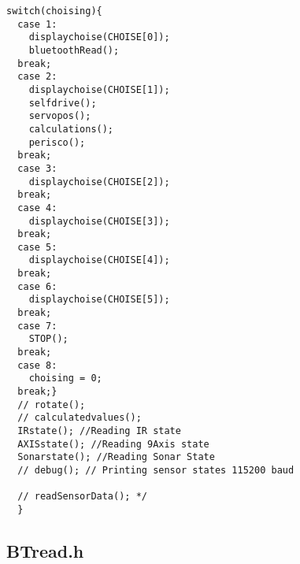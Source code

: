 \begin{lstlisting}
switch(choising){
  case 1:
    displaychoise(CHOISE[0]);
    bluetoothRead();
  break;
  case 2:
    displaychoise(CHOISE[1]);
    selfdrive();
    servopos();
    calculations();
    perisco();
  break;
  case 3:
    displaychoise(CHOISE[2]);
  break;
  case 4:
    displaychoise(CHOISE[3]);
  break;
  case 5:
    displaychoise(CHOISE[4]);
  break;
  case 6:
    displaychoise(CHOISE[5]);
  break;
  case 7:
    STOP();
  break;
  case 8:
    choising = 0;
  break;}  
  // rotate();
  // calculatedvalues();
  IRstate(); //Reading IR state
  AXISstate(); //Reading 9Axis state
  Sonarstate(); //Reading Sonar State
  // debug(); // Printing sensor states 115200 baud
  
  // readSensorData(); */
  }
\end{lstlisting}
\subsection{BTread.h}
